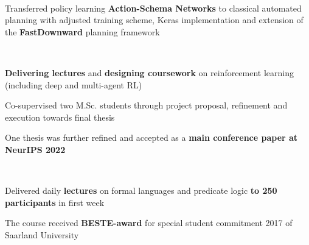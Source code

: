 \documentclass[]{lukas-cv-openfont}
\begin{document}
\noindent
{}
\\
\begin{tightitemize}{1.7em}
    \item Transferred policy learning \textbf{Action-Schema Networks} to classical automated planning with adjusted training scheme, Keras implementation and extension of the \textbf{FastDownward} planning framework
\end{tightitemize}
\sectionsep



\noindent
{}
\\
\begin{tightitemize}{1.7em}
    \item \textbf{Delivering lectures} and \textbf{designing coursework} on reinforcement learning (including deep and multi-agent RL)
\end{tightitemize}
\largesectionsep

\begin{tightitemize}{1.7em}
    \item Co-supervised two M.Sc. students through project proposal, refinement and execution towards final thesis
    \item One thesis was further refined and accepted as a \textbf{main conference paper at NeurIPS 2022}
\end{tightitemize}
\largesectionsep

\noindent
{}
\\
\begin{tightitemize}{1.7em}
    \item Delivered daily \textbf{lectures} on formal languages and predicate logic \textbf{to 250 participants} in first week
    \item The course received \textbf{BESTE-award} for special student commitment 2017 of Saarland University
\end{tightitemize}
\largesectionsep
\end{document}
